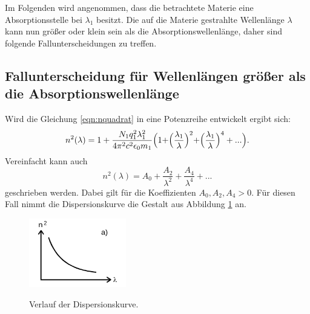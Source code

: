 Im Folgenden wird angenommen, dass die betrachtete Materie eine Absorptionsstelle
bei $\lambda_1$ besitzt. Die auf die Materie gestrahlte Wellenlänge $\lambda$
kann nun größer oder klein sein als die Absorptionswellenlänge, daher sind
folgende Fallunterscheidungen zu treffen.

\subsection{Fallunterscheidung für Wellenlängen größer als die Absorptionswellenlänge} %
Wird die Gleichung \ref{eqn:nquadrat} in eine Potenzreihe entwickelt ergibt
sich:
\begin{equation}
  n^2(\lambda)=1+\frac{N_1 q^{2}_1 \lambda_{1}^{2}}{4\pi^2c^2\epsilon_0 m_1}
  \Bigr(1+\Bigr(\frac{\lambda_1}{\lambda}\Bigl)^2 +\Bigl(\frac{\lambda_1}{\lambda}\Bigr)^4+...\Bigr).
  \label{eqn:nquadratpotenz1}
\end{equation}
Vereinfacht kann auch
\begin{equation}
 n^2(\lambda)= A_0+\frac{A_2}{\lambda^2}+\frac{A_4}{\lambda^4}+...
 \label{eqn:nquadrat1}
\end{equation}
geschrieben werden.
Dabei gilt für die Koeffizienten $A_0,A_2,A_4>0$.
Für diesen Fall nimmt die Dispersionskurve die Gestalt aus
Abbildung \ref{fig:krumminnen} an.

\begin{figure}[H]
  \centering
  \includegraphics[height=3cm]{n1.png}
  \caption{Verlauf der Dispersionskurve.}
  \label{fig:krumminnen}
  \cite{skript}
\end{figure}


